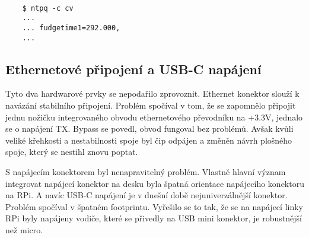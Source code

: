    \begin{lstlisting}

    $ ntpq -c cv
    ...
    ... fudgetime1=292.000,
    ...
   \end{lstlisting}

\subsection{Ethernetové připojení a USB-C napájení}

Tyto dva hardwarové prvky se nepodařilo zprovoznit. Ethernet konektor slouží k navázání
stabilního připojení. Problém spočíval v tom, že se zapomnělo připojit jednu nožičku
integrovaného obvodu ethernetového převodníku na +3.3V, jednalo se o napájení TX. Bypass
se povedl, obvod fungoval bez problémů. Avšak kvůli veliké křehkosti a nestabilnosti spoje
byl čip odpájen a změněn návrh plošného spoje, který se nestihl znovu poptat.

S napájecím konektorem byl nenapravitelný problém. Vlastně hlavní význam integrovat
napájecí konektor na desku byla špatná orientace napájecího konektoru na RPi. A navíc
USB-C napájení je v dnešní době nejuniverzálnější konektor. Problém spočíval v špatném
footprintu. Vyřešilo se to tak, že se na napájecí linky RPi byly napájeny vodiče, které se
přivedly na USB mini konektor, je robustnější než micro.
